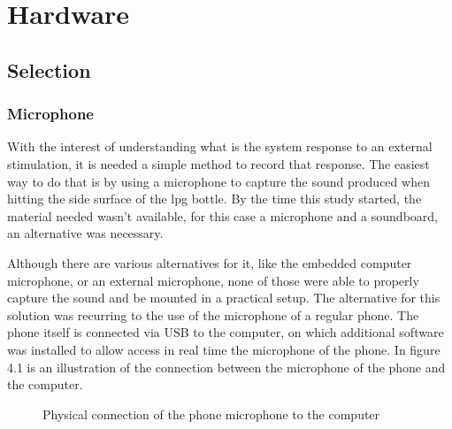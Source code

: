 \cleardoublepage
\chapter{Hardware}\label{chap:hardware}



 
\section{Selection}
\subsection{Microphone}
With the interest of understanding what is the system response to an external stimulation, it is needed a simple method to record that response. The easiest way to do that is by using a microphone to capture the sound produced when hitting the side surface of the \acrshort{lpg} bottle. By the time this study started, the material needed wasn't available, for this case a microphone and a soundboard, an alternative was necessary.

Although there are various alternatives for it, like the embedded computer microphone, or an external microphone, none of those were able to properly capture the sound and be mounted in a practical setup. The alternative for this solution was recurring to the use of the microphone of a regular phone.  The phone itself is connected via USB to the computer, on which additional software was installed to allow access in real time the microphone of the phone.  In figure 4.1 is an illustration of the connection between the microphone of the phone and the computer.
\begin{figure}[]
    \centering
    \caption{Physical connection of the phone microphone to the computer}
    \label{fig:MicConnectio}
\end{figure}
